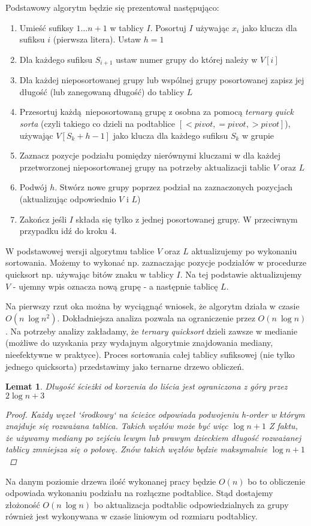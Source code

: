 \documentclass[12pt]{article}
\newtheorem*{lemma}{Lemat}
\begin{document}
Podstawowy algorytm będzie się prezentował następująco:
\begin{enumerate}
    \item Umieść sufiksy $1 \ldots n+1$ w tablicy $I$. Posortuj $I$ używając $x_i$ jako klucza dla sufiksu $i$ (pierwsza litera). Ustaw $h=1$
    \item Dla każdego sufiksu $S_{i+1}$ ustaw numer grupy do której należy w $V[i]$
    \item Dla każdej nieposortowanej grupy lub wspólnej grupy posortowanej zapisz jej długość (lub zanegowaną długość) do tablicy $L$
    \item Przesortuj każdą nieposortowaną grupę z osobna za pomocą \textit{ternary quick sorta} (czyli takiego co dzieli na podtablice $[< \textit{pivot}, = \textit{pivot}, > \textit{pivot}]$), używając $V[S_k + h - 1]$ jako klucza dla każdego sufiksu $S_k$ w grupie
    \item Zaznacz pozycje podziału pomiędzy nierównymi kluczami w dla każdej przetworzonej nieposortowanej grupy na potrzeby aktualizacji tablic $V$ oraz $L$
    \item Podwój $h$. Stwórz nowe grupy poprzez podział na zaznaczonych pozycjach (aktualizując odpowiednio $V$ i $L$)
    \item Zakończ jeśli $I$ składa się tylko z jednej posortowanej grupy. W przeciwnym przypadku idź do kroku 4.
\end{enumerate}

W podstawowej wersji algorytmu tablice $V$ oraz $L$ aktualizujemy po wykonaniu sortowania. Możemy to wykonać np. zaznaczając pozycje podziałów w procedurze quicksort np. używając bitów znaku w tablicy $I$. Na tej podstawie aktualizujemy $V$ - ujemny wpis oznacza nową grupę - a następnie tablicę $L$.

Na pierwszy rzut oka można by wyciągnąć wniosek, że algorytm działa w czasie $O(n\ \log{n}^2)$. Dokładniejsza analiza pozwala na ograniczenie przez $O(n\ \log{n})$. Na potrzeby analizy zakładamy, że \textit{ternary quicksort} dzieli zawsze w medianie (możliwe do uzyskania przy wydajnym algorytmie znajdowania mediany, nieefektywne w praktyce). Proces sortowania całej tablicy sufiksowej (nie tylko jednego quicksorta) przedstawimy jako ternarne drzewo obliczeń.

\begin{lemma}
Długość ścieżki od korzenia do liścia jest ograniczona z góry przez $2 \log{n} + 3$
\begin{proof}
Każdy węzeł `środkowy` na ścieżce odpowiada podwojeniu \textit{h-order} w którym znajduje się rozważana tablica. Takich węzłów może być więc $\log{n} + 1$ Z faktu, że używamy mediany po zejściu lewym lub prawym dzieckiem długość rozważanej tablicy zmniejsza się o połowę. Znów takich węzłów będzie maksymalnie $\log{n} + 1$
\end{proof}
\end{lemma}
Na danym poziomie drzewa ilość wykonanej pracy będzie $O(n)$ bo to obliczenie odpowiada wykonaniu podziału na rozłączne podtablice. Stąd dostajemy złożoność $O(n\ \log{n})$ bo aktualizacja podtablic odpowiedzialnych za grupy również jest wykonywana w czasie liniowym od rozmiaru podtablicy.
\end{document}
